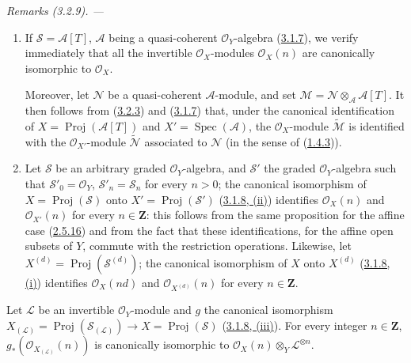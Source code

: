 \par\medskip\noindent\textit{Remarks (3.2.9). ---\ }
\begin{enumerate}
  \item[\rm(i)] If $\mathcal{S}=\mathcal{A}[T]$, $\mathcal{A}$ being a
    quasi-coherent $\mathcal{O}_Y$-algebra
    (\hyperref[II.3.1.7]{3.1.7}), we verify immediately that all the
    invertible $\mathcal{O}_X$-modules $\mathcal{O}_X(n)$ are canonically
    isomorphic to $\mathcal{O}_X$.

    Moreover, let $\mathcal{N}$ be a quasi-coherent $\mathcal{A}$-module, and
    set $\mathcal{M}=\mathcal{N}\otimes_{\mathcal{A}}\mathcal{A}[T]$. It then
    follows from (\hyperref[II.3.2.3]{3.2.3}) and
    (\hyperref[II.3.1.7]{3.1.7}) that, under the canonical identification
    of $X=\operatorname{Proj}(\mathcal{A}[T])$ and
    $X'=\operatorname{Spec}(\mathcal{A})$, the $\mathcal{O}_X$-module
    $\widetilde{\mathcal{M}}$ is identified with the $\mathcal{O}_{X'}$-module
    $\widetilde{\mathcal{N}}$ associated to $\mathcal{N}$ (in the sense of
    (\hyperref[II.1.4.3]{1.4.3})).
  \item[\rm(ii)] Let $\mathcal{S}$ be an arbitrary graded
    $\mathcal{O}_Y$-algebra, and $\mathcal{S}'$ the graded
    $\mathcal{O}_Y$-algebra such that
    $\mathcal{S}'_0=\mathcal{O}_Y$, $\mathcal{S}'_n=\mathcal{S}_n$ for every
    $n>0$; the canonical isomorphism of
    $X=\operatorname{Proj}(\mathcal{S})$ onto
    $X'=\operatorname{Proj}(\mathcal{S}')$
    (\hyperref[II.3.1.8]{3.1.8, (ii)}) identifies $\mathcal{O}_X(n)$ and
    $\mathcal{O}_{X'}(n)$ for every $n\in\mathbf{Z}$: this follows from the
    same proposition for the affine case (\hyperref[II.2.5.16]{2.5.16})
    and from the fact that these identifications, for the affine open subsets
    of $Y$, commute with the restriction operations. Likewise, let
    $X^{(d)}=\operatorname{Proj}(\mathcal{S}^{(d)})$; the canonical
    isomorphism of $X$ onto $X^{(d)}$
    (\hyperref[II.3.1.8]{3.1.8, (i)}) identifies $\mathcal{O}_X(nd)$ and
    $\mathcal{O}_{X^{(d)}}(n)$ for every $n\in\mathbf{Z}$.
\end{enumerate}

\begin{proposition}[3.2.10]
\label{II.3.2.10}
Let $\mathcal{L}$ be an invertible $\mathcal{O}_Y$-module and $g$ the
canonical isomorphism
$X_{(\mathcal{L})}=\operatorname{Proj}(\mathcal{S}_{(\mathcal{L})})
\to X=\operatorname{Proj}(\mathcal{S})$
\textup{(\hyperref[II.3.1.8]{3.1.8, (iii)})}. For every integer $n\in\mathbf{Z}$,
$g_*(\mathcal{O}_{X_{(\mathcal{L})}}(n))$ is canonically isomorphic to
$\mathcal{O}_X(n)\otimes_Y\mathcal{L}^{\otimes n}$.
\end{proposition}


